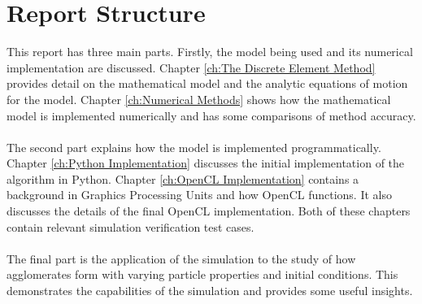 \documentclass[a4paper,11pt,titlepage]{report}
\begin{document}
\section{Report Structure}
This report has three main parts. Firstly, the model being used and its numerical implementation are discussed. Chapter \ref{ch:The Discrete Element Method} provides detail on the mathematical model and the analytic equations of motion for the model. Chapter \ref{ch:Numerical Methods} shows how the mathematical model is implemented numerically and has some comparisons of method accuracy.
\\\\The second part explains how the model is implemented programmatically. Chapter \ref{ch:Python Implementation} discusses the initial implementation of the algorithm in Python. Chapter \ref{ch:OpenCL Implementation} contains a background in Graphics Processing Units and how OpenCL functions. It also discusses the details of the final OpenCL implementation. Both of these chapters contain relevant simulation verification test cases.
\\\\The final part is the application of the simulation to the study of how agglomerates form with varying particle properties and initial conditions. This demonstrates the capabilities of the simulation and provides some useful insights.
\end{document}
